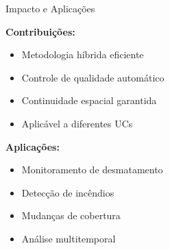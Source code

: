 \documentclass[aspectratio=169,11pt]{beamer}
\begin{document}
\begin{frame}{Impacto e Aplicações}
\vspace{-0.2cm}
\begin{multicols}{2}
    \textbf{\color{ufal}Contribuições:}
    \begin{itemize}
        \item Metodologia híbrida eficiente
        \item Controle de qualidade automático
        \item Continuidade espacial garantida
        \item Aplicável a diferentes UCs
    \end{itemize}
    
    \columnbreak%
    \textbf{\color{success}Aplicações:}
    \begin{itemize}
        \item Monitoramento de desmatamento
        \item Detecção de incêndios
        \item Mudanças de cobertura
        \item Análise multitemporal
    \end{itemize}
\end{multicols}
\end{frame}
\end{document}
